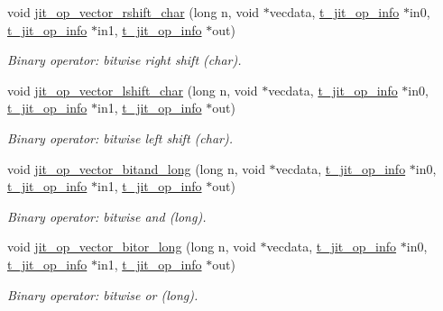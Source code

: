 \begin{DoxyCompactItemize}
void \hyperlink{group__opvecmod_ga9566b7501771b726d1d1b740beaa434b}{jit\_\-op\_\-vector\_\-rshift\_\-char} (long n, void $\ast$vecdata, \hyperlink{structt__jit__op__info}{t\_\-jit\_\-op\_\-info} $\ast$in0, \hyperlink{structt__jit__op__info}{t\_\-jit\_\-op\_\-info} $\ast$in1, \hyperlink{structt__jit__op__info}{t\_\-jit\_\-op\_\-info} $\ast$out)
\begin{DoxyCompactList}\small\item\em Binary operator: bitwise right shift (char). \item\end{DoxyCompactList}\item 
void \hyperlink{group__opvecmod_gaf0577b49b43ab67181b56cc80afec1fa}{jit\_\-op\_\-vector\_\-lshift\_\-char} (long n, void $\ast$vecdata, \hyperlink{structt__jit__op__info}{t\_\-jit\_\-op\_\-info} $\ast$in0, \hyperlink{structt__jit__op__info}{t\_\-jit\_\-op\_\-info} $\ast$in1, \hyperlink{structt__jit__op__info}{t\_\-jit\_\-op\_\-info} $\ast$out)
\begin{DoxyCompactList}\small\item\em Binary operator: bitwise left shift (char). \item\end{DoxyCompactList}\item 
void \hyperlink{group__opvecmod_gaf3d07b5468bd0b35988292be07bcf33d}{jit\_\-op\_\-vector\_\-bitand\_\-long} (long n, void $\ast$vecdata, \hyperlink{structt__jit__op__info}{t\_\-jit\_\-op\_\-info} $\ast$in0, \hyperlink{structt__jit__op__info}{t\_\-jit\_\-op\_\-info} $\ast$in1, \hyperlink{structt__jit__op__info}{t\_\-jit\_\-op\_\-info} $\ast$out)
\begin{DoxyCompactList}\small\item\em Binary operator: bitwise and (long). \item\end{DoxyCompactList}\item 
void \hyperlink{group__opvecmod_ga4124b406dd10e8428d450afa27110c3d}{jit\_\-op\_\-vector\_\-bitor\_\-long} (long n, void $\ast$vecdata, \hyperlink{structt__jit__op__info}{t\_\-jit\_\-op\_\-info} $\ast$in0, \hyperlink{structt__jit__op__info}{t\_\-jit\_\-op\_\-info} $\ast$in1, \hyperlink{structt__jit__op__info}{t\_\-jit\_\-op\_\-info} $\ast$out)
\begin{DoxyCompactList}\small\item\em Binary operator: bitwise or (long). \item\end{DoxyCompactList}\item 

\end{DoxyCompactItemize}
